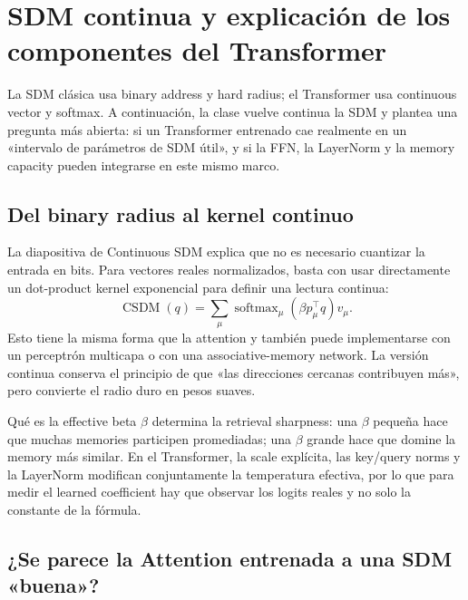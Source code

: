\section{SDM continua y explicación de los componentes del Transformer}

La SDM clásica usa binary address y hard radius; el Transformer usa continuous vector y softmax. A continuación, la clase vuelve continua la SDM y plantea una pregunta más abierta: si un Transformer entrenado cae realmente en un «intervalo de parámetros de SDM útil», y si la FFN, la LayerNorm y la memory capacity pueden integrarse en este mismo marco.

\subsection{Del binary radius al kernel continuo}

La diapositiva de Continuous SDM explica que no es necesario cuantizar la entrada en bits. Para vectores reales normalizados, basta con usar directamente un dot-product kernel exponencial para definir una lectura continua:
$$
\operatorname{CSDM}(q)=
\sum_\mu\operatorname{softmax}_\mu(\beta p_\mu^{\top}q)v_\mu.
$$
Esto tiene la misma forma que la attention y también puede implementarse con un perceptrón multicapa o con una associative-memory network. La versión continua conserva el principio de que «las direcciones cercanas contribuyen más», pero convierte el radio duro en pesos suaves.


\begin{knowledgebox}{Qué es la effective beta}
$\beta$ determina la retrieval sharpness: una $\beta$ pequeña hace que muchas memories participen promediadas; una $\beta$ grande hace que domine la memory más similar. En el Transformer, la scale explícita, las key/query norms y la LayerNorm modifican conjuntamente la temperatura efectiva, por lo que para medir el learned coefficient hay que observar los logits reales y no solo la constante de la fórmula.
\end{knowledgebox}

\subsection{¿Se parece la Attention entrenada a una SDM «buena»?}

